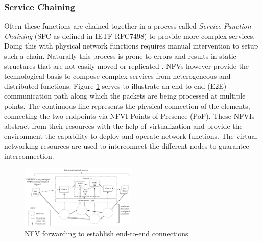 \subsubsection{Service Chaining}
Often these functions are chained together in a process called \textit{Service Function Chaining} (SFC as defined in IETF RFC7498) to provide more complex services. Doing this with physical network functions requires manual intervention to setup such a chain. Naturally this process is prone to errors and results in static structures that are not easily moved or replicated \cite{luizelli2017actual}. NFVs however provide the technological basis to compose complex services from heterogeneous and distributed functions. Figure \ref{img:nfv_forward} serves to illustrate an end-to-end (E2E) communication path along which the packets are being processed at multiple points. The continuous line represents the physical connection of the elements, connecting the two endpoints via NFVI Points of Presence (PoP). These NFVIs abstract from their resources with the help of virtualization and provide the environment the capability to deploy and operate network functions. The virtual networking resources are used to interconnect the different nodes to guarantee interconnection. 

\begin{figure}[h]
	\centering
	\includegraphics[width=0.49\textwidth]{images/nfv_forwarding.png}
	\caption{NFV forwarding to establish end-to-end connections \cite{ etsi1etsi}}
	\label{img:nfv_forward}
\end{figure}

